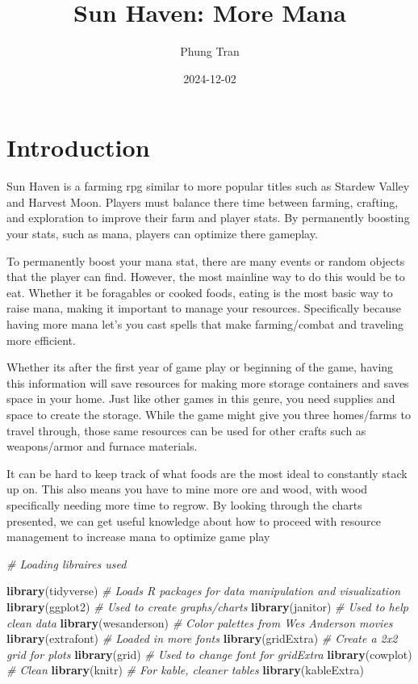 \documentclass[
]{article}
\title{Sun Haven: More Mana}
\author{Phung Tran}
\date{2024-12-02}
\newenvironment{Shaded}{\begin{snugshade}}{\end{snugshade}}
\newcommand{\CommentTok}[1]{\textcolor[rgb]{0.56,0.35,0.01}{\textit{#1}}}
\newcommand{\FunctionTok}[1]{\textcolor[rgb]{0.13,0.29,0.53}{\textbf{#1}}}
\newcommand{\NormalTok}[1]{#1}
\begin{document}
\maketitle

\section{Introduction}\label{introduction}

Sun Haven is a farming rpg similar to more popular titles such as
Stardew Valley and Harvest Moon. Players must balance there time between
farming, crafting, and exploration to improve their farm and player
stats. By permanently boosting your stats, such as mana, players can
optimize there gameplay.

To permanently boost your mana stat, there are many events or random
objects that the player can find. However, the most mainline way to do
this would be to eat. Whether it be foragables or cooked foods, eating
is the most basic way to raise mana, making it important to manage your
resources. Specifically because having more mana let's you cast spells
that make farming/combat and traveling more efficient.

Whether its after the first year of game play or beginning of the game,
having this information will save resources for making more storage
containers and saves space in your home. Just like other games in this
genre, you need supplies and space to create the storage. While the game
might give you three homes/farms to travel through, those same resources
can be used for other crafts such as weapons/armor and furnace
materials.

It can be hard to keep track of what foods are the most ideal to
constantly stack up on. This also means you have to mine more ore and
wood, with wood specifically needing more time to regrow. By looking
through the charts presented, we can get useful knowledge about how to
proceed with resource management to increase mana to optimize game play

\begin{Shaded}
\begin{Highlighting}[]
\CommentTok{\# Loading libraires used}

\FunctionTok{library}\NormalTok{(tidyverse) }\CommentTok{\# Loads R packages for data manipulation and visualization}
\FunctionTok{library}\NormalTok{(ggplot2) }\CommentTok{\# Used to create graphs/charts}
\FunctionTok{library}\NormalTok{(janitor) }\CommentTok{\# Used to help clean data }
\FunctionTok{library}\NormalTok{(wesanderson) }\CommentTok{\# Color palettes from Wes Anderson movies }
\FunctionTok{library}\NormalTok{(extrafont) }\CommentTok{\# Loaded in more fonts }
\FunctionTok{library}\NormalTok{(gridExtra) }\CommentTok{\# Create a 2x2 grid for plots}
\FunctionTok{library}\NormalTok{(grid) }\CommentTok{\# Used to change font for gridExtra}
\FunctionTok{library}\NormalTok{(cowplot) }\CommentTok{\# Clean}
\FunctionTok{library}\NormalTok{(knitr) }\CommentTok{\# For kable, cleaner tables }
\FunctionTok{library}\NormalTok{(kableExtra)}
\end{Highlighting}
\end{Shaded}
\end{document}
